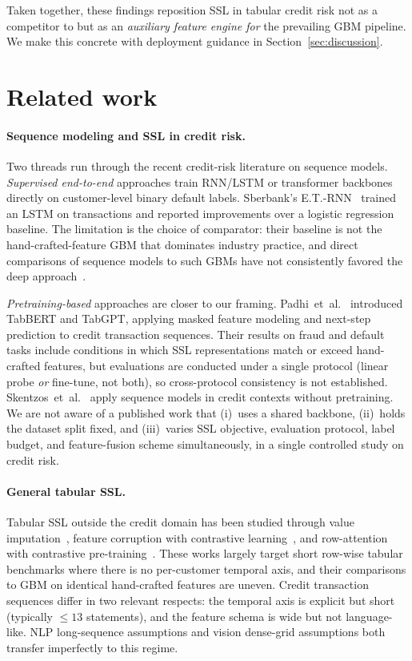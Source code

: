 \documentclass[sigconf, anonymous, review]{acmart}
\begin{document}
Taken together, these findings reposition SSL in tabular credit risk
not as a competitor to but as an \emph{auxiliary feature engine for}
the prevailing GBM pipeline. We make this concrete with deployment
guidance in Section~\ref{sec:discussion}.

\section{Related work}
\label{sec:related}

\paragraph{Sequence modeling and SSL in credit risk.}
Two threads run through the recent credit-risk literature on sequence
models. \emph{Supervised end-to-end} approaches train RNN/LSTM or
transformer backbones directly on customer-level binary default labels.
Sberbank's E.T.-RNN~\cite{Babaev2019} trained an LSTM on transactions
and reported improvements over a logistic regression baseline. The
limitation is the choice of comparator: their baseline is not the
hand-crafted-feature GBM that dominates industry practice, and direct
comparisons of sequence models to such GBMs have not consistently
favored the deep approach~\cite{Sirignano_mortgage,Khandani2010}.

\emph{Pretraining-based} approaches are closer to our framing.
Padhi~et~al.~\cite{Padhi2021} introduced TabBERT and TabGPT, applying
masked feature modeling and next-step prediction to credit transaction
sequences. Their results on fraud and default tasks include conditions
in which SSL representations match or exceed hand-crafted features, but
evaluations are conducted under a single protocol (linear probe
\emph{or} fine-tune, not both), so cross-protocol consistency is not
established. Skentzos~et~al.~\cite{Skentzos2022} apply sequence models
in credit contexts without pretraining. We are not aware of a published
work that (i)~uses a shared backbone, (ii)~holds the dataset split
fixed, and (iii)~varies SSL objective, evaluation protocol, label
budget, and feature-fusion scheme simultaneously, in a single
controlled study on credit risk.

\paragraph{General tabular SSL.}
Tabular SSL outside the credit domain has been studied through value
imputation~\cite{VIME2020}, feature corruption with contrastive
learning~\cite{SCARF2021}, and row-attention with
contrastive pre-training~\cite{SAINT2022}. These works largely target
short row-wise tabular benchmarks where there is no per-customer
temporal axis, and their comparisons to GBM on identical
hand-crafted features are uneven. Credit transaction sequences differ
in two relevant respects: the temporal axis is explicit but short
(typically $\leq 13$ statements), and the feature schema is wide but
not language-like. NLP long-sequence assumptions and vision
dense-grid assumptions both transfer imperfectly to this regime.
\end{document}
